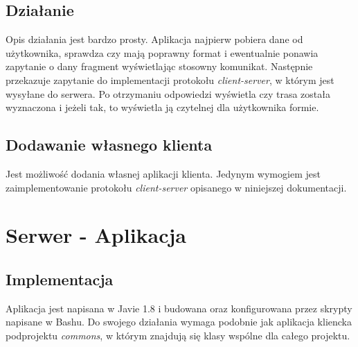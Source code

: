 \documentclass[pdftex,13pt,a4paper]{article}
\begin{document}
\subsection{Działanie}
Opis działania jest bardzo prosty. Aplikacja najpierw pobiera dane od użytkownika, sprawdza czy mają poprawny format i ewentualnie ponawia zapytanie o dany fragment wyświetlając stosowny komunikat. Następnie przekazuje zapytanie do implementacji protokołu \textit{client-server}, w którym jest wysyłane do serwera. Po otrzymaniu odpowiedzi wyświetla czy trasa została wyznaczona i jeżeli tak, to wyświetla ją czytelnej dla użytkownika formie.

\subsection{Dodawanie własnego klienta}
Jest możliwość dodania własnej aplikacji klienta. Jedynym wymogiem jest zaimplementowanie protokołu \textit{client-server} opisanego w niniejszej dokumentacji.



\section{Serwer - Aplikacja}

\subsection{Implementacja}

Aplikacja jest napisana w Javie 1.8 i budowana oraz konfigurowana przez skrypty napisane w Bashu. Do swojego działania wymaga podobnie jak aplikacja kliencka podprojektu \emph{commons}, w którym znajdują się klasy wspólne dla całego projektu.
\end{document}
